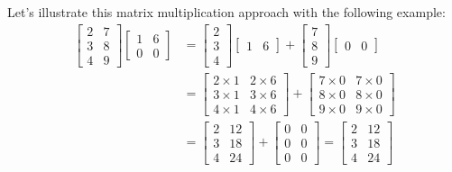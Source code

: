\documentclass[../main.tex]{subfiles}
\begin{document}
Let's illustrate this matrix multiplication approach with the following example:
\begingroup
\allowdisplaybreaks
\begin{align*}
    \begin{bmatrix}
        2 & 7 \\
        3 & 8 \\
        4 & 9
    \end{bmatrix}
    \begin{bmatrix}
        1 & 6 \\
        0 & 0
    \end{bmatrix}
     & =
    \begin{bmatrix}
        2 \\
        3 \\
        4
    \end{bmatrix}
    \begin{bmatrix}
        1 & 6
    \end{bmatrix}
    +
    \begin{bmatrix}
        7 \\
        8 \\
        9
    \end{bmatrix}
    \begin{bmatrix}
        0 & 0
    \end{bmatrix} \\
     & =
    \begin{bmatrix}
        2 \times 1 & 2 \times 6 \\
        3 \times 1 & 3 \times 6 \\
        4 \times 1 & 4 \times 6
    \end{bmatrix}
    +
    \begin{bmatrix}
        7 \times 0 & 7 \times 0 \\
        8 \times 0 & 8 \times 0 \\
        9 \times 0 & 9 \times 0
    \end{bmatrix} \\
     & =
    \begin{bmatrix}
        2 & 12 \\
        3 & 18 \\
        4 & 24
    \end{bmatrix}
    +
    \begin{bmatrix}
        0 & 0 \\
        0 & 0 \\
        0 & 0
    \end{bmatrix}
    =
    \begin{bmatrix}
        2 & 12 \\
        3 & 18 \\
        4 & 24
    \end{bmatrix}
\end{align*}
\end{document}
